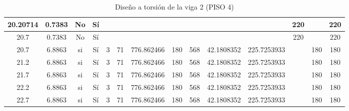 \begin{table}[H]
{\begin{tabular}{|c|c|c|c|c|c|c|c|c|c|c|c|c|c|}
\hline
20.20714 & 0.7383 & No  & Sí  &     &     &     &     &     &     &     & 220 &     & 220 \bigstrut\\
\hline
20.7 & 0.7383 & No  & Sí  &     &     &     &     &     &     &     & 220 &     & 220 \bigstrut\\
\hline
20.7 & 6.8863 & si  & Sí  & 3   & 71  & 776.862466 & 180 & 568 & 42.1808352 & 225.7253933 &     & 180 & 180 \bigstrut\\
\hline
21.2 & 6.8863 & si  & Sí  & 3   & 71  & 776.862466 & 180 & 568 & 42.1808352 & 225.7253933 &     & 180 & 180 \bigstrut\\
\hline
21.7 & 6.8863 & si  & Sí  & 3   & 71  & 776.862466 & 180 & 568 & 42.1808352 & 225.7253933 &     & 180 & 180 \bigstrut\\
\hline
22.2 & 6.8863 & si  & Sí  & 3   & 71  & 776.862466 & 180 & 568 & 42.1808352 & 225.7253933 &     & 180 & 180 \bigstrut\\
\hline
22.7 & 6.8863 & si  & Sí  & 3   & 71  & 776.862466 & 180 & 568 & 42.1808352 & 225.7253933 &     & 180 & 180 \bigstrut\\
\hline
\end{tabular}%

  


  }
      \caption{Diseño a torsión de la viga 2 (PISO 4) }
  \label{tab:T VG2 P4 }%
\end{table}%
